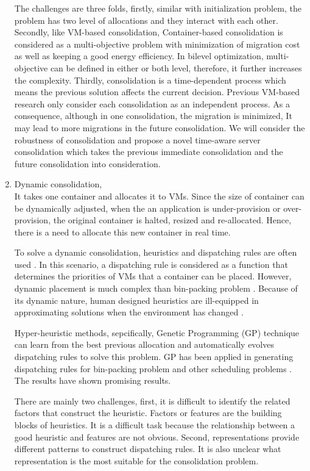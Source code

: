 \begin{enumerate}
The challenges are three folds, firstly, similar with initialization problem, the problem has two level of allocations and they interact with each other. Secondly, like VM-based consolidation, Container-based consolidation is considered as a multi-objective problem with minimization of migration cost as well as keeping a good energy efficiency. In bilevel optimization, multi-objective can be defined in either or both level, therefore, it further increases the complexity. Thirdly, consolidation is a time-dependent process which means the previous solution affects the current decision. Previous VM-based research only consider each consolidation as an independent process. As a consequence, although in one consolidation, the migration is minimized, It may lead to more migrations in the future consolidation. We will consider the robustness of consolidation and propose a novel time-aware server consolidation which takes the previous immediate consolidation and the future consolidation into consideration. 

\item Dynamic consolidation,\\
It takes one container and allocates it to VMs. Since the size of container can be dynamically adjusted, when the an application is under-provision or over-provision, the original container is halted, resized and re-allocated. Hence, there is a need to allocate this new container in real time.

To solve a dynamic consolidation, heuristics and dispatching rules are often used \cite{Sarin:2011fu, Shi:2011ke, Forsman:2015ca, Beloglazov:2012ji}.  In this scenario, a dispatching rule is considered as a function that determines the priorities of VMs that a container can be placed. However, dynamic placement is much complex than bin-packing problem \cite{Mann:2015ua}. Because of its dynamic nature, human designed heuristics are ill-equipped in approximating solutions when the environment has changed \cite{SoteloFigueroa:2013be}. 

Hyper-heuristic methods, sepcifically, Genetic Programming (GP) technique \cite{Banzhaf:1998wc} can learn from the best previous allocation and automatically evolves dispatching rules to solve this problem. GP has been applied in generating dispatching rules for bin-packing problem \cite{Burke:2006ei, SoteloFigueroa:2013be} and other scheduling problems \cite{Nguyen:2014eu}. The results have shown promising results.

There are mainly two challenges, first, it is difficult to identify the related factors that construct the heuristic. Factors or features are the building blocks of heuristics. It is a difficult task because the relationship between a good heuristic and features are not obvious. Second, representations provide different patterns to construct dispatching rules. It is also unclear what representation is the most suitable for the consolidation problem.



\end{enumerate}
